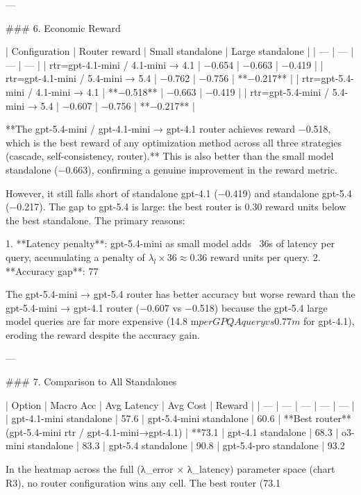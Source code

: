 ---

### 6. Economic Reward

| Configuration | Router reward | Small standalone | Large standalone |
| --- | --- | --- | --- |
| rtr=gpt-4.1-mini / 4.1-mini → 4.1 | −0.654 | −0.663 | −0.419 |
| rtr=gpt-4.1-mini / 5.4-mini → 5.4 | −0.762 | −0.756 | **−0.217** |
| rtr=gpt-5.4-mini / 4.1-mini → 4.1 | **−0.518** | −0.663 | −0.419 |
| rtr=gpt-5.4-mini / 5.4-mini → 5.4 | −0.607 | −0.756 | **−0.217** |

**The gpt-5.4-mini / gpt-4.1-mini → gpt-4.1 router achieves reward −0.518, which is the best reward of any optimization method across all three strategies (cascade, self-consistency, router).** This is also better than the small model standalone (−0.663), confirming a genuine improvement in the reward metric.

However, it still falls short of standalone gpt-4.1 (−0.419) and standalone gpt-5.4 (−0.217). The gap to gpt-5.4 is large: the best router is 0.30 reward units below the best standalone. The primary reasons:

1. **Latency penalty**: gpt-5.4-mini as small model adds ~36s of latency per query, accumulating a penalty of $\lambda_l \times 36 \approx 0.36$ reward units per query.
2. **Accuracy gap**: 77%

The gpt-5.4-mini → gpt-5.4 router has better accuracy but worse reward than the gpt-5.4-mini → gpt-4.1 router (−0.607 vs −0.518) because the gpt-5.4 large model queries are far more expensive (14.8 m$ per GPQA query vs 0.77 m$ for gpt-4.1), eroding the reward despite the accuracy gain.

---

### 7. Comparison to All Standalones

| Option | Macro Acc | Avg Latency | Avg Cost | Reward |
| --- | --- | --- | --- | --- |
| gpt-4.1-mini standalone | 57.6%
| gpt-5.4-mini standalone | 60.6%
| **Best router** (gpt-5.4-mini rtr / gpt-4.1-mini→gpt-4.1) | **73.1%
| gpt-4.1 standalone | 68.3%
| o3-mini standalone | 83.3%
| gpt-5.4 standalone | 90.8%
| gpt-5.4-pro standalone | 93.2%

In the heatmap across the full (λ_error × λ_latency) parameter space (chart R3), no router configuration wins any cell. The best router (73.1%

